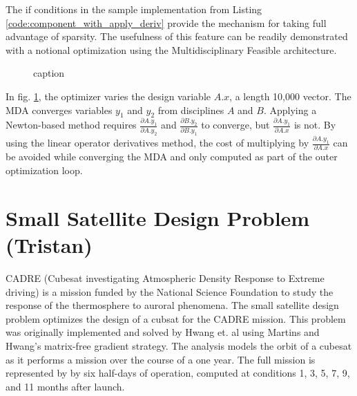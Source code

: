 \documentclass[]{aiaa-tc} %
\begin{document}
    The if conditions in the sample implementation from Listing \ref{code:component_with_apply_deriv} provide the
    mechanism for taking full advantage of sparsity. The usefulness of this feature can be readily demonstrated with
    a notional optimization using the Multidisciplinary Feasible architecture\cite{martins:arch:survey}.

    \begin{figure}[htbp]
        \caption{caption}
        \label{fig:MDF:XDSM}
    \end{figure}

    In fig. \ref{fig:MDF:XDSM}, the optimizer varies the design variable $A.x$, a length 10,000 vector.
    The MDA converges variables $y_1$ and $y_2$ from disciplines $A$ and $B$. Applying a
    Newton-based method requires $\frac{\partial A.y_1}{\partial A.y_2}$ and $\frac{\partial B.y_2}{\partial B.y_1}$
    to converge, but $\frac{\partial A.y_1}{\partial A.x}$ is not. By using the linear operator derivatives method,
    the cost of multiplying by $\frac{\partial A.y_1}{\partial A.x}$ can be avoided while converging the MDA and only
    computed as part of the outer optimization loop.

    \section{Small Satellite Design Problem (Tristan)}

    CADRE (Cubesat investigating Atmospheric Density Response to Extreme driving)
    is a mission funded by the National Science Foundation to study the
    response of the thermosphere to auroral phenomena\cite{cutler2011cubesat}.
    The small satellite design problem optimizes the design of a cubsat for the CADRE mission.
    This problem was originally implemented and solved by Hwang et. al\cite{CADRE2012} using
    Martins and Hwang's matrix-free gradient strategy. The analysis models the orbit of a cubesat
    as it performs a mission over the course of a one year. The full mission is represented by
    by six half-days of operation, computed at conditions 1, 3, 5, 7, 9, and 11 months after launch.
\end{document}
